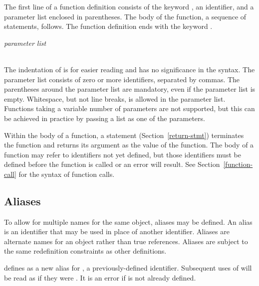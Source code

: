 The first line of a function definition consists of the keyword
, an identifier, and a parameter list enclosed in
parentheses.  The body of the function, a sequence of statements,
follows.  The function definition ends with the keyword .

\begin{syntax}
 \id{}\key{(} \textit{parameter list} \key{)}\\
\codeindent\statements{} \\
\end{syntax}

The indentation of \statements{} is for easier reading and has no
significance in the syntax.  The parameter list consists of zero or
more identifiers, separated by commas.  The parentheses around the
parameter list are mandatory, even if the parameter list is empty.
Whitespace, but not line breaks, is allowed in the parameter list.
Functions taking a variable number of parameters are not supported,
but this can be achieved in practice by passing a list as one of the
parameters.

Within the body of a function, a  statement
(Section~\ref{return-stmt}) terminates the function and returns its
argument as the value of the function.  The body of a function may
refer to identifiers not yet defined, but those identifiers must be
defined before the function is called or an error will result.  See
Section~\ref{function-call} for the syntax of function calls.


\subsection{Aliases}

To allow for multiple names for the same object, aliases may be
defined.  An alias is an identifier that may be used in place of
another identifier.  Aliases are alternate names for an object rather
than true references.  Aliases are subject to the same redefinition
constraints as other definitions.

\begin{syntax}
   
\end{syntax}
defines  as a new alias for , a previously-defined
identifier.  Subsequent uses of  will be read as if they were
.  It is an error if  is not already defined.



